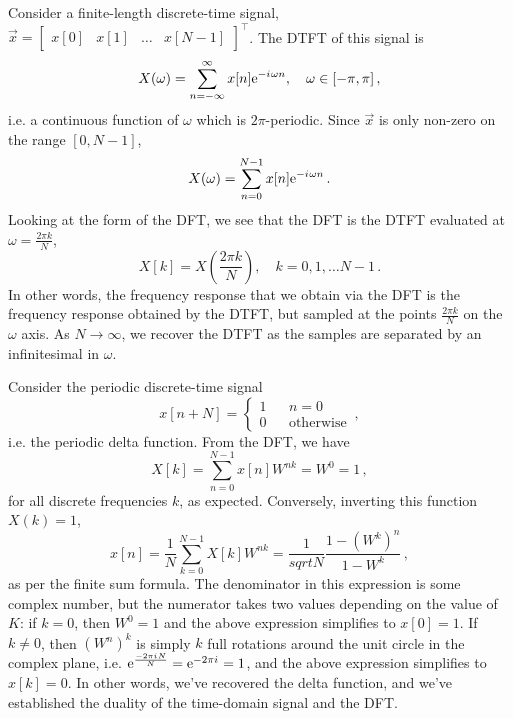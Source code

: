 Consider a finite-length discrete-time signal,
$\vec{x} = \left[\begin{array}{cccc}x[0] & x[1] & \hdots & x[N-1]\end{array}\right]^\top$.
The DTFT of this signal is
%
\begin{displaymath}
  X(\omega) = \sum_{n=-\infty}^\infty x[n]\mathrm{e}^{-{i\mkern1mu}\omega n}, \quad \omega\in[-\pi,\pi] \,,
\end{displaymath}
%
i.e. a continuous function of $\omega$ which is $2\pi$-periodic. Since $\vec{x}$ is
only non-zero on the range $[0,N-1]$,
%
\begin{displaymath}
  X(\omega) = \sum_{n=0}^{N-1}x[n]\mathrm{e}^{-{i\mkern1mu}\omega n} \,.
\end{displaymath}
%
Looking at the form of the DFT, we see that the DFT is the DTFT evaluated at
$\omega = \frac{2\pi k}{N}$,
%
\begin{displaymath}
  X[k] = X(\frac{2\pi k}{N}), \quad k = 0, 1, \hdots N-1 \,.
\end{displaymath}
%
In other words, the frequency response that we obtain via the DFT is the frequency
response obtained by the DTFT, but sampled at the points $\frac{2\pi k}{N}$ on the
$\omega$ axis. As $N\rightarrow\infty$, we recover the DTFT as the samples are separated
by an infinitesimal in $\omega$.
%
\begin{exmp}
  Consider the periodic discrete-time signal
  \begin{displaymath}
    x[n + N] = \left\{\begin{array}{ccl}
      1 & & n = 0 \\
      0 & & \mathrm{otherwise}
    \end{array}\right. \,,
  \end{displaymath}
  i.e. the periodic delta function. From the DFT, we have
  \begin{displaymath}
    X[k] = \sum_{n=0}^{N-1}x[n] W^{nk} = W^0 = 1 \,,
  \end{displaymath}
  for all discrete frequencies $k$, as expected. Conversely, inverting this
  function $X(k) = 1$,
  \begin{displaymath}
    x[n] = \frac{1}{N}\sum_{k=0}^{N-1}X[k] W^{nk}
    = \frac{1}{sqrt{N}}\frac{1 - (W^k)^n}{1 - W^k} \,,
  \end{displaymath}
  as per the finite sum formula. The denominator in this expression
  is some complex number, but the numerator takes two values depending
  on the value of $K$: if $k=0$, then $W^0 = 1$ and the above expression
  simplifies to $x[0] = 1$. If $k\neq 0$, then $(W^n)^k$ is simply $k$
  full rotations around the unit circle in the complex plane, i.e.
  $\mathrm{e}^{\frac{-2\pi{i\mkern1mu} N}{N}} = \mathrm{e}^{-2\pi{i\mkern1mu}} = 1$, and the above
  expression simplifies to $x[k] = 0$. In other words, we've recovered
  the delta function, and we've established the duality of the time-domain
  signal and the DFT.
\end{exmp}
